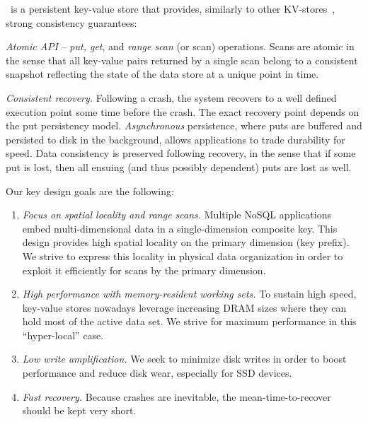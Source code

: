 \sys\ is a persistent key-value store that provides, similarly to other KV-stores~\cite{hbase,leveldb,RocksDB}, 
strong consistency guarantees:

\emph{Atomic API} -- \emph{put, get}, and \emph{range scan} (or scan) operations. 
Scans are atomic in the sense that all key-value pairs returned by a single scan belong to a consistent 
snapshot reflecting the state of the data store at a unique point in time.

\emph{Consistent recovery.} Following a crash, the system recovers to a well defined execution 
point some time before the crash. The exact recovery point depends on the put persistency model.
\emph{Asynchronous} persistence, where puts are buffered and persisted to disk in the background, allows 
applications to trade durability for speed. Data consistency is preserved following recovery, 
in the sense that if some put is lost, then all ensuing (and thus possibly dependent) puts are lost as well.

Our key design goals are the following:
\begin{enumerate}\itemsep0pt
\item \emph{Focus on spatial locality and range scans.}
 Multiple NoSQL applications embed multi-dimensional data in a single-dimension composite key. 
 This design provides high spatial locality on the primary dimension (key prefix). We strive
 to express this locality in physical data organization in order to exploit it efficiently for scans
 by the primary dimension. 
 
\item \emph{High performance  with memory-resident working sets.}
To sustain high speed, key-value stores nowadays leverage increasing DRAM sizes 
where they can hold most of the active data set. We strive for maximum performance 
in this ``hyper-local'' case.

\item \emph{Low write amplification.} We seek to minimize disk writes in order to boost performance 
and reduce disk wear, especially for SSD devices. 

\item \emph{Fast recovery.}  Because crashes are inevitable, 
the mean-time-to-recover should be kept very short. 
\end{enumerate}

